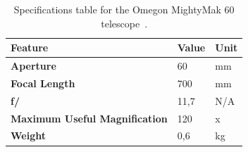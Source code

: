 \begin{table}[]
\centering
\caption{Specifications table for the Omegon MightyMak 60 telescope~\cite{Omegon2021}.}
\label{tab:omegon}
\begin{tabular}{@{}lll@{}}
\toprule
\textbf{Feature}                      & \textbf{Value} & \textbf{Unit} \\ \midrule
\textbf{Aperture}                     & 60             & mm            \\
\textbf{Focal Length}                 & 700            & mm            \\
\textbf{f/}                           & 11,7           & N/A           \\
\textbf{Maximum Useful Magnification} & 120            & x             \\
\textbf{Weight}                       & 0,6            & kg            \\ \bottomrule
\end{tabular}
\end{table}

